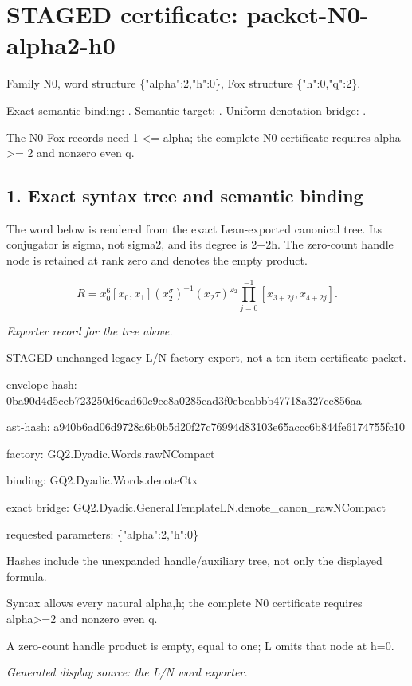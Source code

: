 \section*{STAGED certificate: packet-N0-alpha2-h0}
Family N0, word structure \{"alpha":2,"h":0\}, Fox structure \{"h":0,"q":2\}.

\noindent Exact semantic binding: . Semantic target: . Uniform denotation bridge: .
\par\noindent The N0 Fox records need 1 <= alpha; the complete N0 certificate requires alpha >= 2 and nonzero even q.

\subsection*{1. Exact syntax tree and semantic binding}
The word below is rendered from the exact Lean-exported canonical tree. Its conjugator is sigma, not sigma2, and its degree is 2+2h. The zero-count handle node is retained at rank zero and denotes the empty product.

\[R=x_0^6[x_0,x_1](x_2^\sigma)^{-1}(x_2\tau)^{\omega_2}\prod_{j=0}^{-1}[x_{3+2j},x_{4+2j}].\]
\par\noindent\emph{Exporter record for the tree above.}
\par\noindent STAGED unchanged legacy L/N factory export, not a ten-item certificate packet.
\par\noindent envelope-hash: 0ba90d4d5ceb723250d6cad60c9ec8a0285cad3f0ebcabbb47718a327ce856aa
\par\noindent ast-hash: a940b6ad06d9728a6b0b5d20f27c76994d83103e65accc6b844fe6174755fc10
\par\noindent factory: GQ2.Dyadic.Words.rawNCompact
\par\noindent binding: GQ2.Dyadic.Words.denoteCtx
\par\noindent exact bridge: GQ2.Dyadic.GeneralTemplateLN.denote\_canon\_rawNCompact
\par\noindent requested parameters: \{"alpha":2,"h":0\}
\par\noindent Hashes include the unexpanded handle/auxiliary tree, not only the displayed formula.
\par\noindent Syntax allows every natural alpha,h; the complete N0 certificate requires alpha>=2 and nonzero even q.
\par\noindent A zero-count handle product is empty, equal to one; L omits that node at h=0.
\par\noindent\emph{Generated display source: the L/N word exporter.}
